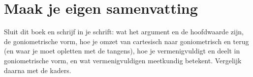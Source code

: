 
\ifzelfstudie
\section*{Maak je eigen samenvatting}
Sluit dit boek en schrijf in je schrift: wat het argument en de hoofdwaarde zijn, de goniometrische vorm, hoe je omzet van cartesisch naar goniometrisch en terug (en waar je moet opletten met de tangens), hoe je vermenigvuldigt en deelt in goniometrische vorm, en wat vermenigvuldigen meetkundig betekent. Vergelijk daarna met de kaders.
\fi
